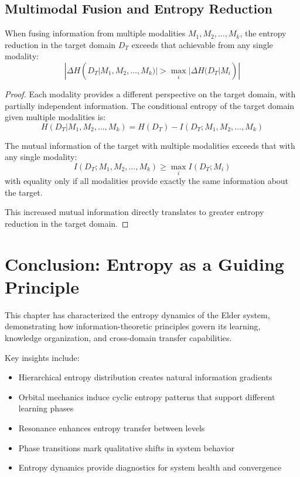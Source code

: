 \subsection{Multimodal Fusion and Entropy Reduction}

\begin{theorem}
When fusing information from multiple modalities $M_1, M_2, \ldots, M_k$, the entropy reduction in the target domain $D_T$ exceeds that achievable from any single modality:
\begin{equation}
|\Delta H(D_T | M_1, M_2, \ldots, M_k)| > \max_i |\Delta H(D_T | M_i)|
\end{equation}
\end{theorem}

\begin{proof}
Each modality provides a different perspective on the target domain, with partially independent information. The conditional entropy of the target domain given multiple modalities is:
\begin{equation}
H(D_T | M_1, M_2, \ldots, M_k) = H(D_T) - I(D_T; M_1, M_2, \ldots, M_k)
\end{equation}

The mutual information of the target with multiple modalities exceeds that with any single modality:
\begin{equation}
I(D_T; M_1, M_2, \ldots, M_k) \geq \max_i I(D_T; M_i)
\end{equation}
with equality only if all modalities provide exactly the same information about the target.

This increased mutual information directly translates to greater entropy reduction in the target domain.
\end{proof}

\section{Conclusion: Entropy as a Guiding Principle}

This chapter has characterized the entropy dynamics of the Elder system, demonstrating how information-theoretic principles govern its learning, knowledge organization, and cross-domain transfer capabilities.

Key insights include:
\begin{itemize}
    \item Hierarchical entropy distribution creates natural information gradients
    \item Orbital mechanics induce cyclic entropy patterns that support different learning phases
    \item Resonance enhances entropy transfer between levels
    \item Phase transitions mark qualitative shifts in system behavior
    \item Entropy dynamics provide diagnostics for system health and convergence
\end{itemize}

